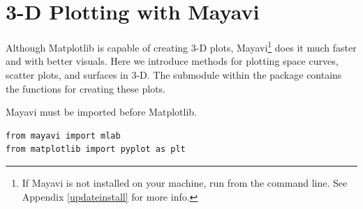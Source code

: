 \section*{3-D Plotting with Mayavi} %

Although Matplotlib is capable of creating 3-D plots, Mayavi\footnote{If Mayavi is not installed on your machine, run  from the command line. See Appendix \ref{updateinstall} for more info.} does it much faster and with better visuals.
Here we introduce methods for plotting space curves, scatter plots, and surfaces in 3-D.
The  submodule within the  package contains the functions for creating these plots.

\begin{warn}
Mayavi must be imported before Matplotlib.
\begin{lstlisting}
from mayavi import mlab
from matplotlib import pyplot as plt
\end{lstlisting}
\end{warn}

